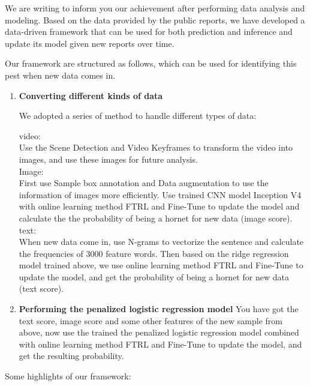 \documentclass[12pt]{article}
\begin{document}
	We are writing to inform you our achievement after performing data analysis and modeling. Based on the data provided by the public reports, we have developed a data-driven framework that can be used for both prediction and inference and update its model given new reports over time.

	Our framework are structured as follows, which can be used for identifying this pest when new data comes in.
	\begin{enumerate}[\bf 1.]
		\item \textbf{Converting different kinds of data }
		
		We adopted a series of method to handle different types of data:
		
		video:\\
		Use the Scene Detection and Video Keyframes to transform the video into images, and use these images for future analysis.\\
		Image:\\
		First use Sample box annotation and Data augmentation to use the information of images more efficiently. Use trained CNN model Inception V4 with online learning method FTRL and Fine-Tune to update the model and calculate the the probability of being a hornet for new data (image score).
		text:\\
		When new data come in, use N-grams to vectorize the sentence and calculate the frequencies of 3000 feature words. Then based on the ridge regression model trained above, we use online learning method FTRL and Fine-Tune to update the model, and get the probability of being a hornet for new data (text score).
		\item \textbf{Performing the penalized logistic regression model}
		You have got the text score, image score and some other features of the new sample from above, now use the trained the penalized logistic regression model combined with online learning method FTRL and Fine-Tune to update the model, and get the resulting probability.
	\end{enumerate}
	Some highlights of our framework:
	
\end{document}
